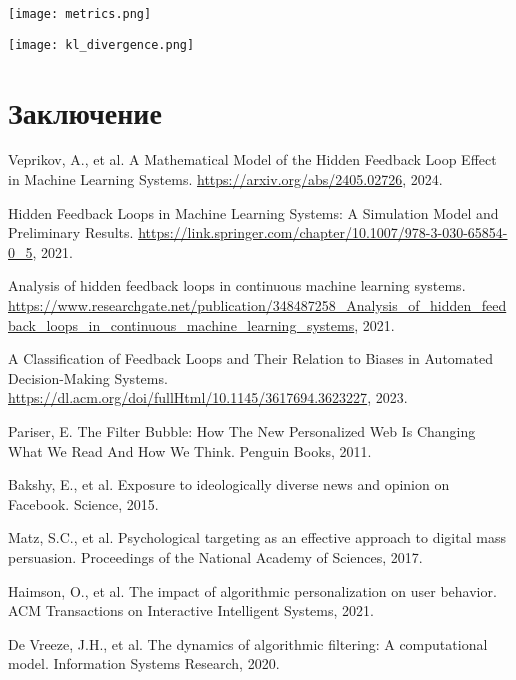 \documentclass{article}
\begin{document}
\begin{center}
\texttt{[image: metrics.png]}
\end{center}


\begin{center}
\texttt{[image: kl\_divergence.png]}
\end{center}


\section{Заключение}



\begin{thebibliography}{10}


Veprikov, A., et al. A Mathematical Model of the Hidden Feedback Loop Effect in Machine Learning Systems. \url{https://arxiv.org/abs/2405.02726}, 2024.


Hidden Feedback Loops in Machine Learning Systems: A Simulation Model and Preliminary Results. \url{https://link.springer.com/chapter/10.1007/978-3-030-65854-0_5}, 2021.


Analysis of hidden feedback loops in continuous machine learning systems. \url{https://www.researchgate.net/publication/348487258_Analysis_of_hidden_feedback_loops_in_continuous_machine_learning_systems}, 2021.


A Classification of Feedback Loops and Their Relation to Biases in Automated Decision-Making Systems. \url{https://dl.acm.org/doi/fullHtml/10.1145/3617694.3623227}, 2023.


Pariser, E. The Filter Bubble: How The New Personalized Web Is Changing What We Read And How We Think. Penguin Books, 2011.


Bakshy, E., et al. Exposure to ideologically diverse news and opinion on Facebook. Science, 2015.


Matz, S.C., et al. Psychological targeting as an effective approach to digital mass persuasion. Proceedings of the National Academy of Sciences, 2017.


Haimson, O., et al. The impact of algorithmic personalization on user behavior. ACM Transactions on Interactive Intelligent Systems, 2021.


De Vreeze, J.H., et al. The dynamics of algorithmic filtering: A computational model. Information Systems Research, 2020.



\end{thebibliography}
\end{document}
